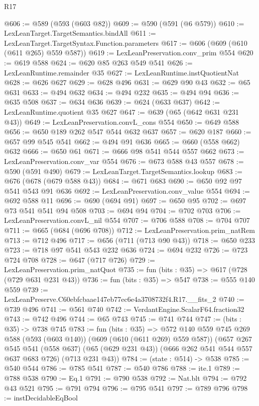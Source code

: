 \begin{lexlean}{R17}
\begin{coremodule}
@606 := @589 (@593 (@603 @82))
@609 := @590 (@591 (@6 @579))
@610 := LexLeanTarget.TargetSemantics.bindAll
@611 := LexLeanTarget.TargetSyntax.Function.parameters
@617 := @606 (@609 (@610 (@611 @265) @559 @587))
@619 := LexLeanPreservation.conv_prim @554
@620 := @619 @588
@624 := @620 @85 @263 @549 @541
@626 := LexLeanRuntime.remainder @35
@627 := LexLeanRuntime.instQuotientNat
@628 := @626 @627
@629 := @628 @496
@631 := @629 @90 @43
@632 := @65 @631
@633 := @494 @632
@634 := @494 @232
@635 := @494 @94
@636 := @635 @508
@637 := @634 @636
@639 := @624 (@633 @637)
@642 := LexLeanRuntime.quotient @35 @627
@647 := @639 (@65 (@642 @631 @231 @43))
@649 := LexLeanPreservation.convL_cons @554
@650 := @649 @588
@656 := @650 @189 @262 @547 @544 @632 @637
@657 := @620 @187
@660 := @657 @99 @545 @541
@662 := @494 @91 @636
@665 := @660 (@558 @662) @632
@666 := @650 @61
@671 := @666 @98 @541 @544 @557 @662
@673 := LexLeanPreservation.conv_var @554
@676 := @673 @588 @43 @557
@678 := @590 (@591 @490)
@679 := LexLeanTarget.TargetSemantics.lookup
@683 := @676 (@678 (@679 @588 @43))
@684 := @671 @683
@690 := @650 @92 @97 @541 @543 @91 @636
@692 := LexLeanPreservation.conv_value @554
@694 := @692 @588 @11
@696 := @690 (@694 @91)
@697 := @650 @95
@702 := @697 @73 @541 @541 @94 @508
@703 := @694 @94
@704 := @702 @703
@706 := LexLeanPreservation.convL_nil @554
@707 := @706 @588
@708 := @704 @707
@711 := @665 (@684 (@696 @708))
@712 := LexLeanPreservation.prim_natRem
@713 := @712 @496
@717 := @656 (@711 (@713 @90 @43))
@718 := @650 @233
@723 := @718 @97 @541 @543 @232 @636
@724 := @694 @232
@726 := @723 @724 @708
@728 := @647 (@717 @726)
@729 := LexLeanPreservation.prim_natQuot
@735 := fun (bits : @35) => @617 (@728 (@729 @631 @231 @43))
@736 := fun (bits : @35) => @547
@738 := @555 @140 @559
@739 := LexLeanPreserve.C60ebfcbaae147eb77ec6e4a3708732f4.R17.__fits_2
@740 := @739 @496
@741 := @561 @740
@742 := VerdantEngine.ScalarF64.fraction32
@743 := @742 @496
@744 := @65 @743
@745 := @741 @744
@747 := (bits : @35) -> @738 @745
@783 := fun (bits : @35) =>
  @572
    @140
    @559
    @745
    @269
    @588
    (@593 (@603 @140))
    (@609 (@610 (@611 @269) @559 @587))
    (@657
      @267
      @545
      @541
      (@558 @637)
      (@65 (@629 @231 @43))
      (@666 @262 @541 @544 @557 @637 @683 @726)
      (@713 @231 @43))
@784 := (state : @514) -> @538
@785 := @540 @544
@786 := @785 @541
@787 := @540 @786
@788 := ite.{1}
@789 := @788 @538
@790 := Eq.{1}
@791 := @790 @538
@792 := Nat.blt
@794 := @792 @43 @521
@795 := @791 @794
@796 := @795 @541
@797 := @789 @796
@798 := instDecidableEqBool

\end{coremodule}
\end{lexlean}
